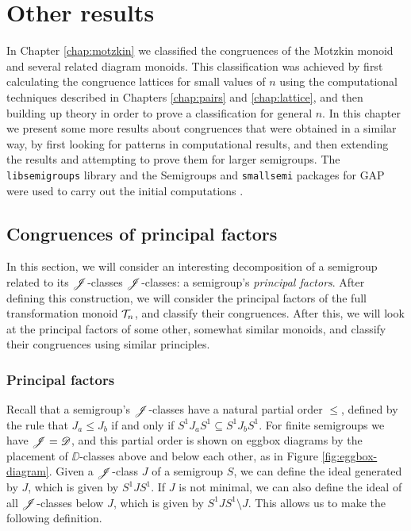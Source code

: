 \chapter{Other results}
\label{chap:other}

In Chapter \ref{chap:motzkin} we classified the congruences of the Motzkin
monoid and several related diagram monoids.  This classification was achieved by
first calculating the congruence lattices for small values of $n$ using the
computational techniques described in Chapters \ref{chap:pairs} and
\ref{chap:lattice}, and then building up theory in order to prove a
classification for general $n$.  In this chapter we present some more results
about congruences that were obtained in a similar way, by first looking for
patterns in computational results, and then extending the results and attempting
to prove them for larger semigroups.  The \texttt{libsemigroups} library and the
Semigroups and \texttt{smallsemi} packages for GAP were used to carry out the
initial computations \cite{libsemigroups, semigroups, smallsemi, gap}.

\section{Congruences of principal factors}
\label{sec:princfact}

In this section, we will consider an interesting decomposition of a semigroup
related to its $\mathscr{J}$-classes $\mathrel{\mathscr{J}}$-classes: a semigroup's \textit{principal
  factors}.  After defining this construction, we will consider the principal
factors of the full transformation monoid $\mathcal{T}_n$, and classify their
congruences.
After this, we will look at the principal factors of some other, somewhat
similar monoids, and classify their congruences using similar principles.

\subsection{Principal factors}
\label{sec:princfact-def}

Recall that a semigroup's $\mathrel{\mathscr{J}}$-classes have a natural partial order $\leq$,
defined by the rule that $J_a \leq J_b$ if and only if
$S^1 J_a S^1 \subseteq S^1 J_b S^1$.  For finite semigroups we have $\mathscr{J}=\mathscr{D}$,
and this partial order is shown on eggbox diagrams by the placement of
$\DD$-classes above and below each other, as in Figure \ref{fig:eggbox-diagram}.
Given a $\mathrel{\mathscr{J}}$-class $J$ of a semigroup $S$, we can define the ideal generated by
$J$, which is given by $S^1 J S^1$.  If $J$ is not minimal, we can also define
the ideal of all $\mathrel{\mathscr{J}}$-classes below $J$, which is given by
$S^1 J S^1 \setminus J$.  This allows us to make the following definition.

